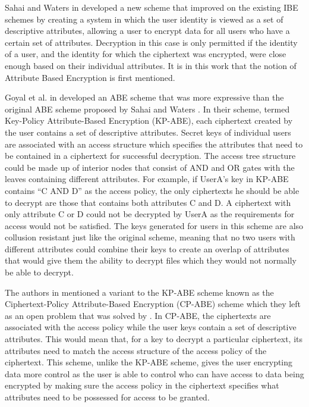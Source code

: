Sahai and Waters in \cite{Sahai2005} developed a new scheme that improved on the existing IBE schemes by creating a system in which the user identity is viewed as a set of descriptive attributes, allowing a user to encrypt data for all users who have a certain set of attributes. Decryption in this case is only permitted if the identity of a user, and the identity for which the ciphertext was encrypted, were close enough based on their individual attributes. It is in this work that the notion of Attribute Based Encryption is first mentioned.

Goyal et al. in \cite{Goyal2006} developed an ABE scheme that was more expressive than the original ABE scheme proposed by Sahai and Waters \cite{Sahai2005}. In their scheme, termed Key-Policy Attribute-Based Encryption (KP-ABE), each ciphertext created by the user contains a set of descriptive attributes. Secret keys of individual users are associated with an access structure which specifies the attributes that need to be contained in a ciphertext for successful decryption. The access tree structure could be made up of interior nodes that consist of AND and OR gates with the leaves containing different attributes. For example, if UserA’s key in KP-ABE contains “C AND D” as the access policy, the only ciphertexts he should be able to decrypt are those that contains both attributes C and D. A ciphertext with only attribute C or D could not be decrypted by UserA as the requirements for access would not be satisfied. The keys generated for users in this scheme are also collusion resistant just like the original scheme, meaning that no two users with different attributes could combine their keys to create an overlap of attributes that would give them the ability to decrypt files which they would not normally be able to decrypt.

The authors in \cite{Goyal2006} mentioned a variant to the KP-ABE scheme known as the Ciphertext-Policy Attribute-Based Encryption (CP-ABE) scheme which they left as an open problem that was solved by \cite{Bethencourt2007}. In CP-ABE, the ciphertexts are associated with the access policy while the user keys contain a set of descriptive attributes. This would mean that, for a key to decrypt a particular ciphertext, its attributes need to match the access structure of the access policy of the ciphertext. This scheme, unlike the KP-ABE scheme, gives the user encrypting data more control as the user is able to control who can have access to data being encrypted by making sure the access policy in the ciphertext specifies what attributes need to be possessed for access to be granted.

